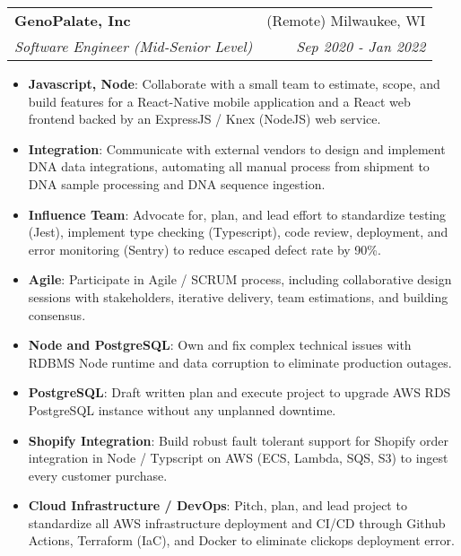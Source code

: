 \documentclass[letterpaper,11pt]{article}
\makeatletter
\newcommand{\resumeItem}[2]{
  \item\small{
    \textbf{#1}{: #2 \vspace{-2pt}}
  }
}
\newcommand{\resumeSubheading}[4]{
  \vspace{-1pt}\item
    \begin{tabular*}{0.97\textwidth}{l@{\extracolsep{\fill}}r}
      \textbf{#1} & #2 \\
      \textit{\small#3} & \textit{\small #4} \\
    \end{tabular*}\vspace{-5pt}
}
\newcommand{\resumeItemListStart}{\begin{itemize}}
\newcommand{\resumeItemListEnd}{\end{itemize}\vspace{-5pt}}
\makeatother
\begin{document}
    \resumeSubheading
      {GenoPalate, Inc}{(Remote) Milwaukee, WI}
      {Software Engineer (Mid-Senior Level)}{Sep 2020 - Jan 2022}
      \resumeItemListStart
        \resumeItem{Javascript, Node}
          {Collaborate with a small team to estimate, scope, and build features for a React-Native mobile application and a React web frontend backed by an ExpressJS / Knex (NodeJS) web service.}
        \resumeItem{Integration}
          {Communicate with external vendors to design and implement DNA data integrations, automating all manual process from shipment to DNA sample processing and DNA sequence ingestion.}
        \resumeItem{Influence Team}
          {Advocate for, plan, and lead effort to standardize testing (Jest), implement type checking (Typescript), code review, deployment, and error monitoring (Sentry) to reduce escaped defect rate by 90\%.}
        \resumeItem{Agile}
          {Participate in Agile / SCRUM process, including collaborative design sessions with stakeholders, iterative delivery, team estimations, and building consensus.}
        \resumeItem{Node and PostgreSQL}
          {Own and fix complex technical issues with RDBMS Node runtime and data corruption to eliminate production outages.}
        \resumeItem{PostgreSQL}
          {Draft written plan and execute project to upgrade AWS RDS PostgreSQL instance without any unplanned downtime.}
        \resumeItem{Shopify Integration}
          {Build robust fault tolerant support for Shopify order integration in Node / Typscript on AWS (ECS, Lambda, SQS, S3) to ingest every customer purchase.}
        \resumeItem{Cloud Infrastructure / DevOps}
          {Pitch, plan, and lead project to standardize all AWS infrastructure deployment and CI/CD through Github Actions, Terraform (IaC), and Docker to eliminate clickops deployment error.}
      \resumeItemListEnd
\end{document}
